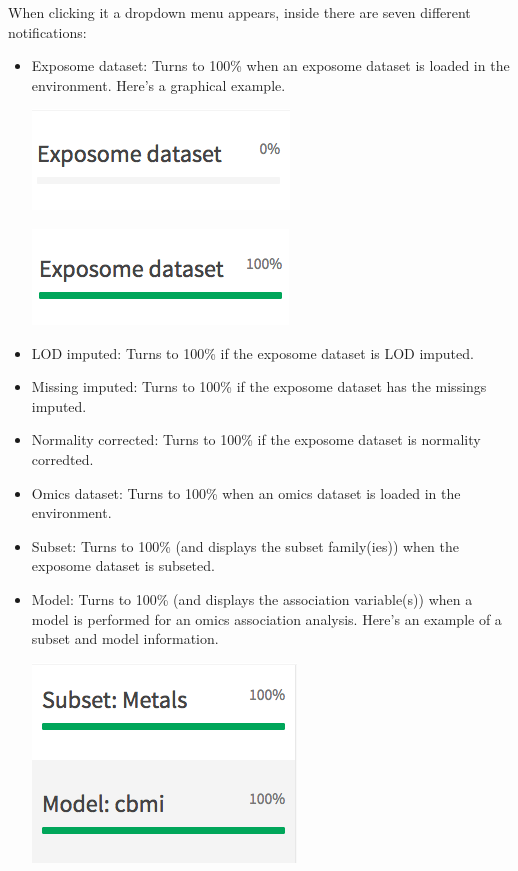 \documentclass[
]{book}
\providecommand{\tightlist}{%
  \setlength{\itemsep}{0pt}\setlength{\parskip}{0pt}}
\begin{document}
When clicking it a dropdown menu appears, inside there are seven different notifications:

\begin{itemize}
\tightlist
\item
  Exposome dataset: Turns to 100\% when an exposome dataset is loaded in the environment. Here's a graphical example.

  \includegraphics{images/general2.png}

  \includegraphics{images/general3.png}
\item
  LOD imputed: Turns to 100\% if the exposome dataset is LOD imputed.
\item
  Missing imputed: Turns to 100\% if the exposome dataset has the missings imputed.
\item
  Normality corrected: Turns to 100\% if the exposome dataset is normality corredted.
\item
  Omics dataset: Turns to 100\% when an omics dataset is loaded in the environment.
\item
  Subset: Turns to 100\% (and displays the subset family(ies)) when the exposome dataset is subseted.
\item
  Model: Turns to 100\% (and displays the association variable(s)) when a model is performed for an omics association analysis. Here's an example of a subset and model information.

  \includegraphics{images/general4.png}
\end{itemize}
\end{document}
